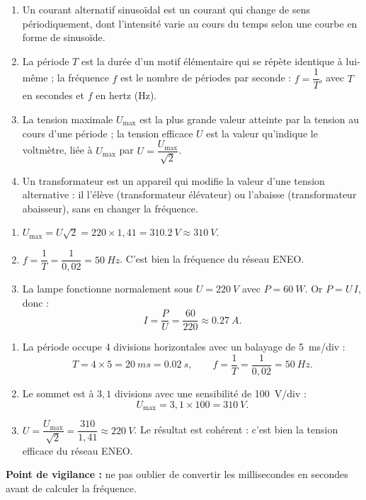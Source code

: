 \documentclass[11pt]{article}
\newcommand{\cle}[1]{{\popxbold\color{popdark}#1}}
\begin{document}
\begin{corrige}
\begin{enumerate}
\item Un \cle{courant alternatif sinusoïdal} est un courant qui change de sens périodiquement, dont l'intensité varie au cours du temps selon une courbe en forme de sinusoïde.
\item La \cle{période} $T$ est la durée d'un motif élémentaire qui se répète identique à lui-même ; la \cle{fréquence} $f$ est le nombre de périodes par seconde : $f = \dfrac{1}{T}$, avec $T$ en secondes et $f$ en hertz (Hz).
\item La \cle{tension maximale} $U_{\max}$ est la plus grande valeur atteinte par la tension au cours d'une période ; la \cle{tension efficace} $U$ est la valeur qu'indique le voltmètre, liée à $U_{\max}$ par $U = \dfrac{U_{\max}}{\sqrt{2}}$.
\item Un \cle{transformateur} est un appareil qui modifie la valeur d'une tension alternative : il l'élève (transformateur élévateur) ou l'abaisse (transformateur abaisseur), sans en changer la fréquence.
\end{enumerate}
\end{corrige}

\begin{corrige}
\begin{enumerate}
\item $U_{\max} = U\sqrt{2} = 220 \times 1{,}41 = \SI{310,2}{V} \approx \SI{310}{V}$.
\item $f = \dfrac{1}{T} = \dfrac{1}{0{,}02} = \SI{50}{Hz}$. C'est bien la fréquence du réseau ENEO.
\item La lampe fonctionne normalement sous $U = \SI{220}{V}$ avec $P = \SI{60}{W}$. Or $P = U\,I$, donc :
\[ I = \frac{P}{U} = \frac{60}{220} \approx \SI{0,27}{A}. \]
\end{enumerate}
\end{corrige}

\begin{corrige}
\begin{enumerate}
\item La période occupe 4 divisions horizontales avec un balayage de \SI{5}{ms/div} :
\[ T = 4 \times 5 = \SI{20}{ms} = \SI{0,02}{s}, \qquad f = \frac{1}{T} = \frac{1}{0{,}02} = \SI{50}{Hz}. \]
\item Le sommet est à $3{,}1$ divisions avec une sensibilité de \SI{100}{V/div} :
\[ U_{\max} = 3{,}1 \times 100 = \SI{310}{V}. \]
\item $U = \dfrac{U_{\max}}{\sqrt{2}} = \dfrac{310}{1{,}41} \approx \SI{220}{V}$. Le résultat est cohérent : c'est bien la tension efficace du réseau ENEO.
\end{enumerate}
\textbf{Point de vigilance :} ne pas oublier de convertir les millisecondes en secondes avant de calculer la fréquence.
\end{corrige}
\end{document}
